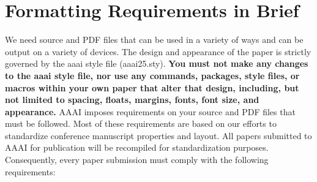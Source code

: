 \documentclass[letterpaper]{article} %
\begin{document}
\section{Formatting Requirements in Brief}
We need source and PDF files that can be used in a variety of ways and can be output on a variety of devices. The design and appearance of the paper is strictly governed by the aaai style file (aaai25.sty).
\textbf{You must not make any changes to the aaai style file, nor use any commands, packages, style files, or macros within your own paper that alter that design, including, but not limited to spacing, floats, margins, fonts, font size, and appearance.} AAAI imposes requirements on your source and PDF files that must be followed. Most of these requirements are based on our efforts to standardize conference manuscript properties and layout. All papers submitted to AAAI for publication will be recompiled for standardization purposes. Consequently, every paper submission must comply with the following requirements:
\end{document}
